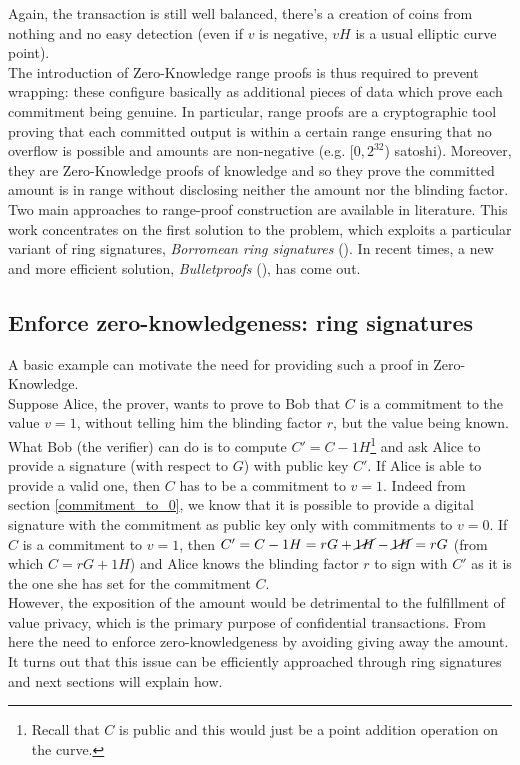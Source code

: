 Again, the transaction is still well balanced, there's a creation of coins from nothing and no easy detection (even if $v$ is negative, $vH$ is a usual elliptic curve point).\\
The introduction of Zero-Knowledge range proofs is thus required to prevent wrapping: these configure basically as additional pieces of data which prove each commitment being genuine. In particular, range proofs are a cryptographic tool proving that each committed output is within a certain range ensuring that no overflow is possible and amounts are non-negative (e.g. [$0,2^{32}$) satoshi). Moreover, they are Zero-Knowledge proofs of knowledge and so they prove the committed amount is in range without disclosing neither the amount nor the blinding factor.\\
Two main approaches to range-proof construction are available in literature. This work concentrates on the first solution to the problem, which exploits a particular variant of ring signatures, \textit{Borromean ring signatures} (\cite{Borromean}). In recent times, a new and more efficient solution, \textit{Bulletproofs} (\cite{Bulletproofs}), has come out.

\subsection{Enforce zero-knowledgeness: ring signatures}
\label{example:ZK}
A basic example can motivate the need for providing such a proof in Zero-Knowledge.\\ 
Suppose Alice, the prover, wants to prove to Bob that $C$ is a commitment to the value $v=1$, without telling him the blinding factor $r$, but the value being known.\\
What Bob (the verifier) can do is to compute $C' = C - 1H$\footnote{Recall that $C$ is public and this would just be a point addition operation on the curve.} and ask Alice to provide a signature (with respect to $G$) with public key $C'$. If Alice is able to provide a valid one, then $C$ has to be a commitment to $v=1$. Indeed from section \ref{commitment_to_0}, we know that it is possible to provide a digital signature with the commitment as public key only with commitments to $v=0$. If $C$ is a commitment to $v=1$, then $C'= C - 1H = rG + \cancel{1H} - \cancel{1H} = rG$ (from which $C = rG + 1H$) and Alice knows the blinding factor $r$ to sign with $C'$ as it is the one she has set for the commitment $C$.\\
However, the exposition of the amount would be detrimental to the fulfillment of value privacy, which is the primary purpose of confidential transactions. From here the need to enforce zero-knowledgeness by avoiding giving away the amount. It turns out that this issue can be efficiently approached through ring signatures and next sections will explain how.

